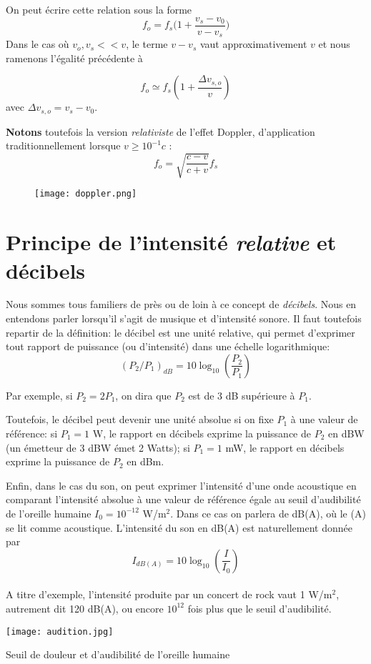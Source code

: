 On peut écrire cette relation sous la forme
$$ f_{o} = f_s\Big(1+\frac{v_s-v_{0}}{v-v_{s}}\Big)$$
Dans le cas où $v_{o},v_{s} << v$, le terme $v-v_s$ vaut approximativement $v$ et nous ramenons l'égalité précédente à 

\[f_{o} \simeq f_{s} (1 + \frac{\Delta v_{s,o}}{v}) \]
avec $\Delta v_{s,o}=v_s-v_0$.

\textbf{Notons} toutefois la version \textit{relativiste} de l'effet Doppler, d'application traditionnellement lorsque $v \geq 10^{-1} c$ : 
\[  f_{o} = \sqrt{\frac{c-v}{c + v}} f_{s}\]

\begin{figure*}
	\texttt{[image: doppler.png]}
\end{figure*}

\section{Principe de l'intensité \textit{relative} et décibels} 

Nous sommes tous familiers de près ou de loin à ce concept de \textit{décibels}. Nous en entendons parler lorsqu'il s'agit de musique et d'intensité sonore. Il faut toutefois repartir de la définition: le décibel est une unité relative, qui permet d'exprimer tout rapport de puissance (ou d'intensité) dans une échelle logarithmique:
\[ (P_2/P_1)_{dB} = 10 \log_{10}(\frac{P_2}{P_1}) \]

Par exemple, si $P_2 = 2P_1$, on dira que $P_2$ est de 3 dB supérieure à $P_1$. 

Toutefois, le décibel peut devenir une unité absolue si on fixe $P_1$ à une valeur de référence: si $P_1 = 1$ W, le rapport en décibels exprime la puissance de $P_2$ en dBW (un émetteur de 3 dBW émet 2 Watts); si $P_1 = 1$ mW, le rapport en décibels exprime la puissance de $P_2$ en dBm. 

Enfin, dans le cas du son, on peut exprimer l'intensité d'une onde acoustique en comparant l'intensité absolue à une valeur de référence égale au seuil d'audibilité de l'oreille humaine $I_0 = 10^{-12}$ W/m$^2$. Dans ce cas on parlera de dB(A), où le (A) se lit comme acoustique. L'intensité du son en dB(A) est naturellement donnée par 
\[ I_{dB(A)} = 10 \log_{10}(\frac{I}{I_{0}}) \]
\\ 
A titre d'exemple, l'intensité produite par un concert de rock vaut 1 W/m$^2$, autrement dit 120 dB(A), ou encore $10^{12}$ fois plus que le seuil d'audibilité. 
\begin{marginfigure}[-5cm]
	\texttt{[image: audition.jpg]}
	\caption{Seuil de douleur et d'audibilité de l'oreille humaine}
\end{marginfigure}
